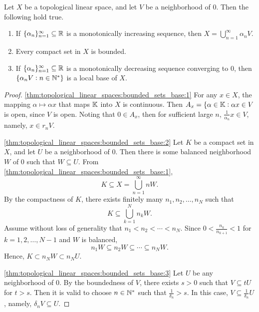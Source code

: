 \begin{thm}
\label{thm:topological_linear_spaces:bounded_sets_base}
Let $X$ be a topological linear space, and let $V$ be a neighborhood of $0$. 
Then the following hold true. 
\begin{enumerate}
    \item \label{thm:topological_linear_spaces:bounded_sets_base:1}
    If $\{ \alpha_n \}_{n=1}^{\infty} \subseteq \mathbb{R}$ is a monotonically 
    increasing sequence, then $X = \bigcup_{n=1}^\infty \alpha_n V$. 
    \item \label{thm:topological_linear_spaces:bounded_sets_base:2}
    Every compact set in $X$ is bounded. 
    \item \label{thm:topological_linear_spaces:bounded_sets_base:3}
    If $\{ \alpha_n \}_{n=1}^{\infty} \subseteq \mathbb{R}$ is a 
    monotonically decreasing sequence converging to $0$, then $\left\{ 
    \alpha_n V: n \in \mathbb{N}^\ast \right\}$ is a local base of $X$. 
\end{enumerate}
\end{thm}
\begin{proof}
\ref{thm:topological_linear_spaces:bounded_sets_base:1}
For any $x \in X$, the mapping $\alpha \mapsto \alpha x$ that maps $\mathbb{K}$ 
into $X$ is continuous. 
Then $A_x = \{\alpha \in \mathbb{K}: \alpha x \in V$ is open, since $V$ is open. 
Noting that $0 \in A_x$, then for sufficient large $n$, $\frac{1}{\alpha_n} 
x \in V$, namely, $x \in r_n V$. 

\ref{thm:topological_linear_spaces:bounded_sets_base:2}
Let $K$ be a compact set in $X$, and let $U$ be a neighborhood of $0$. 
Then there is some balanced neighborhood $W$ of $0$ such that 
$W \subseteq U$. 
From \ref{thm:topological_linear_spaces:bounded_sets_base:1}, 
\begin{equation*}
    K \subseteq X = \bigcup_{n= 1}^\infty n W. 
\end{equation*}
By the compactness of $K$, there exists finitely many $n_1, n_2, \ldots, 
n_N$ such that 
\begin{equation*}
    K \subseteq \bigcup_{k=1}^N n_k W. 
\end{equation*}
Assume without loss of generality that $n_1 < n_2 < \cdots < n_N$. 
Since $0 < \frac{n_k}{n_{k+1}} < 1$  for $k = 1, 2, \ldots, N - 1$ and 
$W$ is balanced, 
\begin{equation*}
    n_1 W \subseteq n_2 W \subseteq \cdots \subseteq n_N W. 
\end{equation*}
Hence, $K \subset n_N W \subset n_N U$. 

\ref{thm:topological_linear_spaces:bounded_sets_base:3}
Let $U$ be any neighborhood of $0$. 
By the boundedness of $V$, there exists $s > 0$ such that $V \subseteq tU$ 
for $t > s$. 
Then it is valid to choose $n \in \mathbb{N}^\ast$ such that $\frac{1}{\delta_n} > s$. 
In this case, $V \subseteq \frac{1}{\delta_n} U$, namely, $\delta_n V 
\subseteq U$. 
\end{proof}

